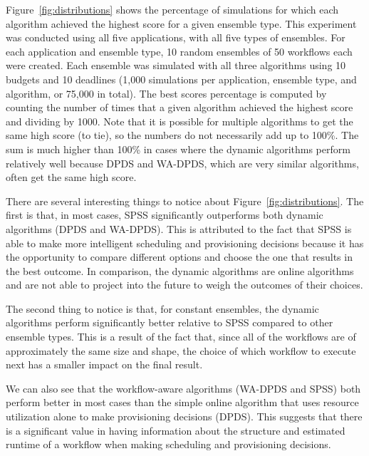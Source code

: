 \documentclass[preprint,5p]{elsarticle}
\begin{document}
Figure~\ref{fig:distributions} shows the percentage of simulations for which
each algorithm achieved the highest score for a given ensemble type. This
experiment was conducted using all five applications, with all five types of
ensembles. For each application and ensemble type, 10 random ensembles of 50
workflows each were created. Each ensemble was simulated with all three
algorithms using 10 budgets and 10 deadlines (1,000 simulations per
application, ensemble type, and algorithm, or 75,000 in total). The best scores percentage is
computed by counting the number of times that a given algorithm achieved the
highest score and dividing by 1000. Note that it is possible for multiple
algorithms to get the same high score (to tie), so the numbers do not
necessarily add up to 100\%. The sum is much higher than 100\% in cases where
the dynamic algorithms perform relatively well because DPDS and WA-DPDS, which
are very similar algorithms, often get the same high score.



There are several interesting things to notice about
Figure~\ref{fig:distributions}. The first is that, in most cases, SPSS
significantly outperforms both dynamic algorithms (DPDS and WA-DPDS). This is
attributed to the fact that SPSS is able to make more intelligent scheduling
and provisioning decisions because it has the opportunity to compare different
options and choose the one that results in the best outcome. In comparison,
the dynamic algorithms are online algorithms and are not able to project into
the future to weigh the outcomes of their choices.

The second thing to notice is that, for constant ensembles, the dynamic
algorithms perform significantly better relative to SPSS compared to  other
ensemble types. This is a result of the fact that, since all of the workflows
are of approximately the same size and shape, the choice of which workflow to
execute next has a smaller impact on the final result.

We can also see that the workflow-aware
algorithms (WA-DPDS and SPSS) both perform better in most cases than the
simple online algorithm that uses resource utilization alone to make
provisioning decisions (DPDS). This suggests that there is a significant value
in having information about the structure and estimated runtime of a workflow
when making scheduling and provisioning decisions.
\end{document}
